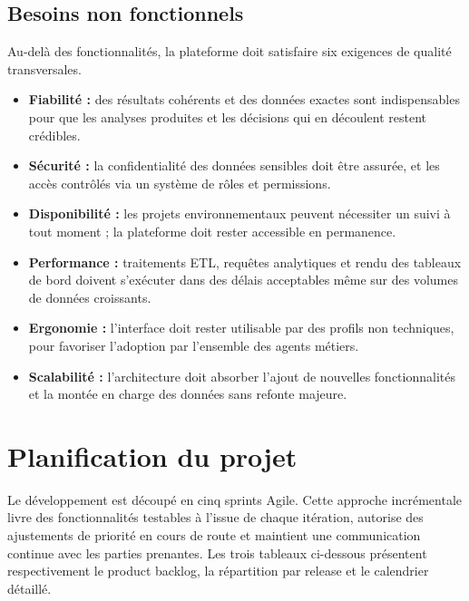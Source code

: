 \subsection{Besoins non fonctionnels}

Au-delà des fonctionnalités, la plateforme doit satisfaire
six exigences de qualité transversales.

\begin{itemize}
    \item \textbf{Fiabilité :} des résultats cohérents et des données
    exactes sont indispensables pour que les analyses produites et
    les décisions qui en découlent restent crédibles.

    \item \textbf{Sécurité :} la confidentialité des données sensibles
    doit être assurée, et les accès contrôlés via un système de rôles
    et permissions.

    \item \textbf{Disponibilité :} les projets environnementaux
    peuvent nécessiter un suivi à tout moment ; la plateforme doit
    rester accessible en permanence.

    \item \textbf{Performance :} traitements ETL, requêtes analytiques
    et rendu des tableaux de bord doivent s'exécuter dans des délais
    acceptables même sur des volumes de données croissants.

    \item \textbf{Ergonomie :} l'interface doit rester utilisable par
    des profils non techniques, pour favoriser l'adoption par
    l'ensemble des agents métiers.

    \item \textbf{Scalabilité :} l'architecture doit absorber l'ajout
    de nouvelles fonctionnalités et la montée en charge des données
    sans refonte majeure.
\end{itemize}

\section{Planification du projet}

Le développement est découpé en cinq sprints Agile. Cette approche
incrémentale livre des fonctionnalités testables à l'issue de
chaque itération, autorise des ajustements de priorité en cours de
route et maintient une communication continue avec les parties
prenantes. Les trois tableaux ci-dessous présentent respectivement
le product backlog, la répartition par release et le calendrier
détaillé.

